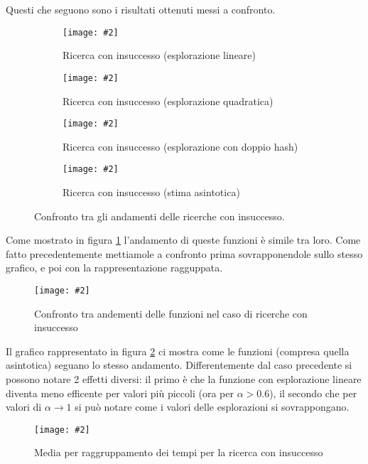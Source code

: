 \documentclass{article}
\newcommand{\image}[3][1]{
	\centering
	\texttt{[image: \#2]}
	\caption{#3}
}
\begin{document}
Questi che seguono sono i risultati ottenuti messi a confronto.
\begin{figure}[H]
\begin{subfigure}[b]{0.5\textwidth}
\image{Insuccesso_Lineare_scala_logaritmica}{Ricerca con insuccesso (esplorazione lineare)}
\end{subfigure}
\begin{subfigure}[b]{0.5\textwidth}
\image{Insuccesso_Quadratico_scala_logaritmica}{Ricerca con insuccesso (esplorazione quadratica)}
\end{subfigure}
\begin{subfigure}[b]{0.5\textwidth}
\image{Insuccesso_Doppio_scala_logaritmica}{Ricerca con insuccesso (esplorazione con doppio hash)}
\end{subfigure}
\begin{subfigure}[b]{0.5\textwidth}
\image{Insuccesso_Asintotica_scala_logaritmica}{Ricerca con insuccesso (stima asintotica)}
\end{subfigure}
\caption{Confronto tra gli andamenti delle ricerche con insuccesso.}
\label{fig:Insuccesso_quartetto}
\end{figure}

Come mostrato in figura \ref{fig:Insuccesso_quartetto} l'andamento di queste funzioni è simile tra loro. Come fatto precedentemente mettiamole a confronto prima sovrapponendole sullo stesso grafico, e poi con la rappresentazione ragguppata.  

\begin{figure}[H]
\image[0.75]{Insuccesso_Confronto_Asintotico_scala_logaritmica}{Confronto tra andementi delle funzioni nel caso di ricerche con insuccesso}
\label{fig:Insuccesso_Confronto_Asintotico_scala_logaritmica}
\end{figure}

Il grafico rappresentato in figura \ref{fig:Insuccesso_Confronto_Asintotico_scala_logaritmica} ci mostra come le funzioni (compresa quella asintotica) seguano lo stesso andamento. Differentemente dal caso precedente si possono notare 2 effetti diversi: il primo è che la funzione con esplorazione lineare diventa meno efficente per valori più piccoli (ora per $\alpha > 0.6$), il secondo che per valori di $\alpha \longrightarrow 1$ si può notare come i valori delle esplorazioni si sovrappongano.

\begin{figure}[H]
\image[0.75]{Insuccesso_Confronto_barre_scala_logaritmica}{Media per raggruppamento dei tempi per la ricerca con insuccesso}
\label{fig:Insuccesso_Confronto_barre_scala_logaritmica}
\end{figure}
\end{document}
